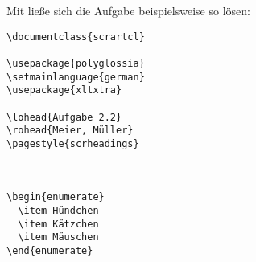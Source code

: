 % 


Mit  ließe sich die Aufgabe beispielsweise so lösen:
\begin{lstlisting}
\documentclass{scrartcl}

\usepackage{polyglossia} 
\setmainlanguage{german}
\usepackage{xltxtra}

\lohead{Aufgabe 2.2}
\rohead{Meier, Müller}
\pagestyle{scrheadings}



\begin{enumerate}
  \item Hündchen
  \item Kätzchen
  \item Mäuschen
\end{enumerate}


\end{lstlisting}